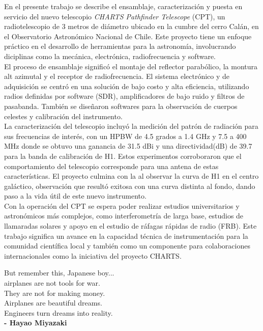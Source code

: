 \documentclass[
	spanish, %
	letterpaper, oneside
]{book}
\begin{document}
\templatePortrait

\templatePagecfg

\begin{abstractd}
	En el presente trabajo se describe el ensamblaje, caracterización y puesta en servicio del nuevo telescopio \textit{CHARTS Pathfinder Telescope} (CPT), un radiotelescopio de 3 metros de diámetro ubicado en la cumbre del cerro Calán, en el Observatorio Astronómico Nacional de Chile. Este proyecto tiene un enfoque práctico en el desarrollo de herramientas para la astronomía, involucrando diciplinas como la mecánica, electrónica, radiofrecuencia y software.\\
	
	El proceso de ensamblaje significó el montaje del reflector parabólico, la montura alt azimutal y el receptor de radiofrecuencia. El sistema electrónico y de adquisición se centró en una solución de bajo costo y alta eficiencia, utilizando radios definidas por software (SDR), amplificadores de bajo ruido y filtros de pasabanda. También se diseñaron softwares para la observación de cuerpos celestes y calibración del instrumento.\\

	La caracterización del telescopio incluyó la medición del patrón de radiación para sus frecuencias de interés, con un HPBW de 4.5 grados a 1.4 GHz y 7.5 a 400 MHz donde se obtuvo una ganancia de 31.5 dBi y una directividad(dB) de 39.7 para la banda de calibración de H1. Estos experimentos corroboraron que el comportamiento del telescopio corresponde para una antena de estas características. El proyecto culmina con la  al observar la curva de H1 en el centro galáctico, observación que resultó exitosa con una curva distinta al fondo, dando paso a la vida útil de este nuevo instrumento.\\

	Con la operación del CPT se espera poder realizar estudios universitarios y astronómicos más complejos, como interferometría de larga base, estudios de llamaradas solares y apoyo  en el estudio de ráfagas rápidas de radio (FRB). Este trabajo significa un avance en la capacidad técnica de instrumentación para la comunidad científica local y también como un componente para colaboraciones internacionales como la iniciativa del proyecto CHARTS. \\
\end{abstractd}

\begin{dedicatory}
	But remember this, Japanese boy...\\
	airplanes are not tools for war.\\
	They are not for making money.\\ 
	Airplanes are beautiful dreams. \\
	Engineers turn dreams into reality.\\

	\textbf{- Hayao Miyazaki}
\end{dedicatory}
\end{document}
